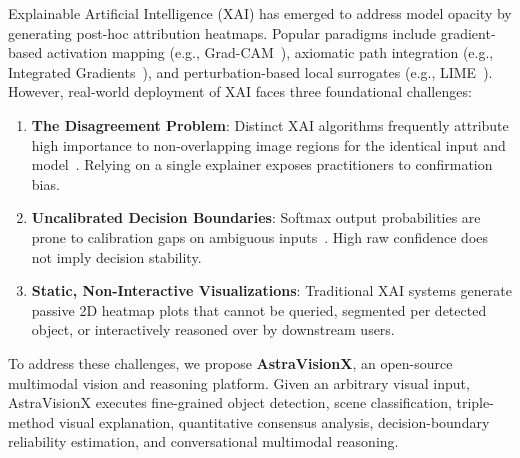\documentclass[journal,10pt,twocolumn]{IEEEtran}
\begin{document}
Explainable Artificial Intelligence (XAI) has emerged to address model opacity by generating post-hoc attribution heatmaps. Popular paradigms include gradient-based activation mapping (e.g., Grad-CAM~\cite{selvaraju2017gradcam}), axiomatic path integration (e.g., Integrated Gradients~\cite{sundararajan2017axiomatic}), and perturbation-based local surrogates (e.g., LIME~\cite{ribeiro2016why}). However, real-world deployment of XAI faces three foundational challenges:
\begin{enumerate}
    \item \textbf{The Disagreement Problem}: Distinct XAI algorithms frequently attribute high importance to non-overlapping image regions for the identical input and model~\cite{krishna2022disagreement}. Relying on a single explainer exposes practitioners to confirmation bias.
    \item \textbf{Uncalibrated Decision Boundaries}: Softmax output probabilities are prone to calibration gaps on ambiguous inputs~\cite{guo2017calibration,hendrycks2017baseline}. High raw confidence does not imply decision stability.
    \item \textbf{Static, Non-Interactive Visualizations}: Traditional XAI systems generate passive 2D heatmap plots that cannot be queried, segmented per detected object, or interactively reasoned over by downstream users.
\end{enumerate}

To address these challenges, we propose \textbf{AstraVisionX}, an open-source multimodal vision and reasoning platform. Given an arbitrary visual input, AstraVisionX executes fine-grained object detection, scene classification, triple-method visual explanation, quantitative consensus analysis, decision-boundary reliability estimation, and conversational multimodal reasoning.
\end{document}
